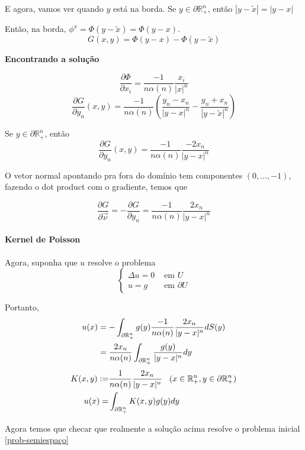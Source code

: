 \documentclass[11pt]{article}
\newcommand{\p}{\partial}
\newcommand{\pde}[2]{\frac{\p #1}{\p #2}}
\newcommand{\dirdev}[1]{\pde{#1}{\vec{\nu}}}
\begin{document}
E agora, vamos ver quando \(y\) está na borda.
Se \(y \in \p\mathbb{R}^n_+\), então \( |y - \tilde{x} | = |y-x | \)

Então, na borda, \(\phi^x = \Phi(y-\tilde{x}) = \Phi(y-x)\).
\[ G(x,y) = \Phi(y-x) - \Phi(y-\tilde{x}) \]





\textbf{Encontrando a solução}

\begin{equation}\label{derivada-da-Phi}
	\frac{\p\Phi}{\p x_i} = \frac{-1}{n \alpha(n)} \frac{x_i}{|x|^n}
\end{equation} 
\[ \frac{\p G}{\p y_n}(x,y) = \frac{-1}{n \alpha(n)} \left ( \frac{y_n - x_n}{|y-x|^n} - \frac{y_n+x_n}{|y-\tilde{x}|^n} \right ) \]

Se \(y \in \partial\mathbb{R}^n_+\), então
\[ \frac{\partial G}{\partial y_n}(x,y) = \frac{-1}{n \alpha(n)}\frac{-2x_n}{|y-x|^n} \]

O vetor normal apontando pra fora do domínio tem componentes \((0,\ldots,-1)\), fazendo o dot product com o gradiente, temos que

\[ \dirdev{G} = - \pde{G}{y_n} = \frac{-1}{n \alpha(n)}\frac{2x_n}{|y-x|^n}\]

\paragraph{Kernel de Poisson}

Agora, suponha que \(u\) resolve o problema
\begin{equation}\label{prob-semiespaço}
\begin{cases}
	\Delta u = 0 & \text{ em } U\\
	u = g & \text{ em } \p U
\end{cases}
\end{equation}

Portanto,
\begin{align*}
	u(x) &= - \int_{\partial \mathbb{R}^n_+} g(y) \frac{-1}{n \alpha(n)}\frac{2x_n}{|y-x|^n} dS(y)\\
	&= \frac{2x_n}{n \alpha(n)} \int_{\partial \mathbb{R}^n_+} \frac{g(y)}{|y-x|^n} dy
\end{align*}
\begin{align*}
	K(x,y) :=& \frac{1}{n \alpha(n)}\frac{2x_n}{|y-x|^n} \;\;\; (x \in \seR, y \in \p\seR)\\
	u(x) =& \int_{\p\seR} K(x,y) g(y) dy 
\end{align*}


Agora temos que checar que realmente a solução acima resolve o problema inicial \eqref{prob-semiespaço}
\end{document}
